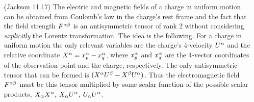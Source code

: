 \newcommand{\Fab}{F^{\alp \bet}}
\newcommand{\Ua}{U^\alp}
\newcommand{\Usa}{U_\alp}
\newcommand{\Ub}{U^\bet}
\newcommand{\Xa}{X^\alp}
\newcommand{\Xsa}{X_\alp}
\newcommand{\Xb}{X^\bet}
\newcommand{\xap}{x^\alp_p}
\newcommand{\xaq}{x^\alp_q}

\begin{statement}{(Jackson 11.17)}
	The electric and magnetic fields  of a charge in uniform motion can be obtained from Coulomb's law in the charge's rest frame and the fact that the field strength $\Fab$ is an antisymmetric tensor of rank 2 without considering \emph{explicitly} the Lorentz transformation.  The idea is the following.  For a charge in uniform motion the only relevant variables are the charge's 4-velocity $\Ua$ and the relative coordinate $\Xa = \xap - \xaq$, where $\xap$ and $\xaq$ are the 4-vector coordinates of the observation point and the charge, respectively.  The only antisymmetric tensor that can be formed is $(\Xa \Ub - \Xb \Ua)$.  Thus the electromagnetic field $\Fab$ must be this tensor multiplied by some scalar function of the possible scalar products, $\Xsa \Xa$, $\Xsa \Ua$, $\Usa \Ua$.
\end{statement}

\newcommand{\vbb}{\vb{b}}
\newcommand{\vv}{\vb{v}}
\newcommand{\Eq}{E_1}
\newcommand{\Ew}{E_2}
\newcommand{\Ee}{E_3}
\newcommand{\Bq}{B_1}
\newcommand{\Bw}{B_2}
\newcommand{\Be}{B_3}

\newcommand{\xsq}{x^1}


